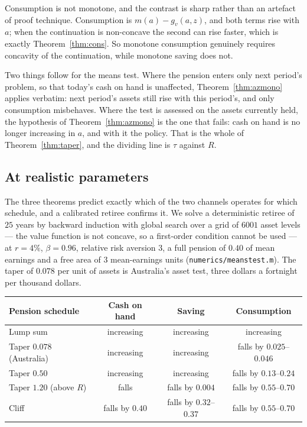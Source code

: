 Consumption is not monotone, and the contrast is sharp rather than an artefact of proof
technique. Consumption is $m(a)-g_v(a,z)$, and both terms rise with $a$; when the continuation is
non-concave the second can rise faster, which is exactly Theorem~\ref{thm:cons}. So monotone
consumption genuinely requires concavity of the continuation, while monotone saving does not.

Two things follow for the means test. Where the pension enters only next period's problem, so
that today's cash on hand is unaffected, Theorem~\ref{thm:azmono} applies verbatim: next period's
assets still rise with this period's, and only consumption misbehaves. Where the test is assessed
on the assets currently held, the hypothesis of Theorem~\ref{thm:azmono} is the one that fails:
cash on hand is no longer increasing in $a$, and with it the policy. That is the whole of
Theorem~\ref{thm:taper}, and the dividing line is $\tau$ against $R$.

\subsection{At realistic parameters}

The three theorems predict exactly which of the two channels operates for which schedule, and a
calibrated retiree confirms it. We solve a deterministic retiree of $25$ years by backward
induction with global search over a grid of $6001$ asset levels --- the value function is not
concave, so a first-order condition cannot be used --- at $r=4\%$, $\beta=0.96$, relative risk
aversion $3$, a full pension of $0.40$ of mean earnings and a free area of $3$ mean-earnings units
(\texttt{numerics/meanstest.m}). The taper of $0.078$ per unit of assets is Australia's asset test,
three dollars a fortnight per thousand dollars.

\begingroup\small
\begin{center}
\begin{tabular}{@{}lccc@{}}
\toprule
Pension schedule & Cash on hand & Saving & Consumption \\
\midrule
Lump sum & increasing & increasing & increasing \\
Taper $0.078$ (Australia) & increasing & increasing & falls by $0.025$--$0.046$ \\
Taper $0.50$ & increasing & increasing & falls by $0.13$--$0.24$ \\
Taper $1.20$ (above $R$) & falls & falls by $0.004$ & falls by $0.55$--$0.70$ \\
Cliff & falls by $0.40$ & falls by $0.32$--$0.37$ & falls by $0.55$--$0.70$ \\
\bottomrule
\end{tabular}
\end{center}
\endgroup

